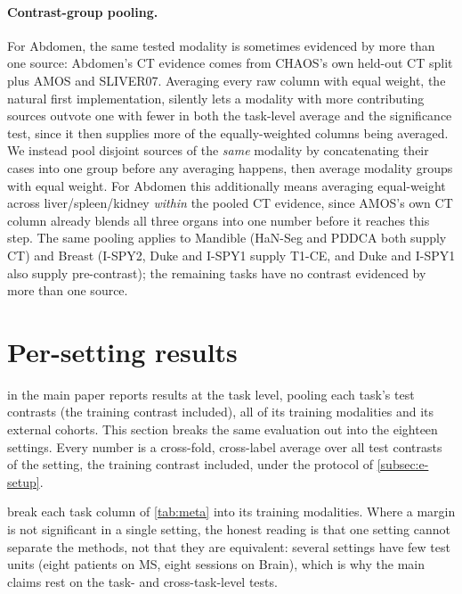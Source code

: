 \paragraph{Contrast-group pooling.} For Abdomen, the same tested modality is
sometimes evidenced by more than one source: Abdomen's CT evidence comes from
CHAOS's own held-out CT split plus AMOS and SLIVER07. Averaging every raw
column with equal weight, the natural first implementation, silently
lets a modality with more contributing sources outvote one with fewer in
both the task-level average and the significance test, since it
then supplies more of the equally-weighted columns being averaged. We
instead pool disjoint sources of the \emph{same} modality by concatenating
their cases into one group before any averaging happens, then average
modality groups with equal weight. For Abdomen this additionally means
averaging equal-weight across liver/spleen/kidney \emph{within} the pooled
CT evidence, since AMOS's own CT column already blends all three organs
into one number before it reaches this step. The same pooling applies to
Mandible (HaN-Seg and PDDCA both supply CT) and Breast (I-SPY2, Duke
and I-SPY1 supply T1-CE, and Duke and I-SPY1 also supply
pre-contrast); the remaining tasks have no
contrast evidenced by more than one source.

\FloatBarrier
\section{Per-setting results}
\label{sec:suppl-persetting}

 in the main paper reports results at the task level, pooling
each task's test contrasts (the training contrast included), all of its
training modalities and its external cohorts. This section breaks the same
evaluation out into the eighteen settings. Every number is a cross-fold,
cross-label average over all test contrasts of the setting, the training
contrast included, under the protocol of \cref{subsec:e-setup}.



 break each task column of
\cref{tab:meta} into its training modalities. Where a margin is not
significant in a single setting, the honest reading is that one setting
cannot separate the methods, not that they are equivalent: several settings
have few test units (eight patients on MS, eight sessions on Brain),
which is why the
main claims rest on the task- and cross-task-level tests.

